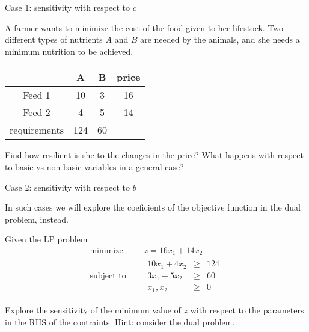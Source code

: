 \documentclass[c]{beamer}
\begin{document}
\begin{frame}{Case 1: sensitivity with respect to $c$}

  \begin{Exercise}
    A farmer wants to minimize the cost of the food given to her lifestock. Two different types of nutrients $A$ and $B$ are needed by the animals, and she needs a minimum nutrition to be achieved.
    \begin{center}
    \begin{tabular}{c|c|c|c}
     & A & B & price\\
     \hline
     Feed 1 & 10 & 3 & 16\\
     Feed 2 & 4 & 5 & 14\\
     \hline
     requirements & 124 & 60 & \\
    \end{tabular}
    \end{center}

    Find how resilient is she to the changes in the price? What happens with respect to basic vs non-basic variables in a general case?

  \end{Exercise}
\end{frame}

\begin{frame}{Case 2: sensitivity with respect to $b$}

  In such cases we will explore the coeficients of the objective function in the dual problem, instead.

  \begin{Exercise}
    Given the LP problem
    \begin{equation*}
      \begin{aligned}
        \text{minimize } \quad & z = 16x_1+14x_2 \\
        \text{subject to }\quad &
        \begin{array}{rcl}
          10x_1 + 4x_2 &\geq &124 \\
          3x_1 + 5x_2 &\geq &60 \\
          x_1,x_2 &\geq& 0
        \end{array}
      \end{aligned}
    \end{equation*}

    Explore the sensitivity of the minimum value of $z$ with respect to the parameters in the RHS of the contraints. Hint: consider the dual problem.

  \end{Exercise}

\end{frame}
\end{document}
